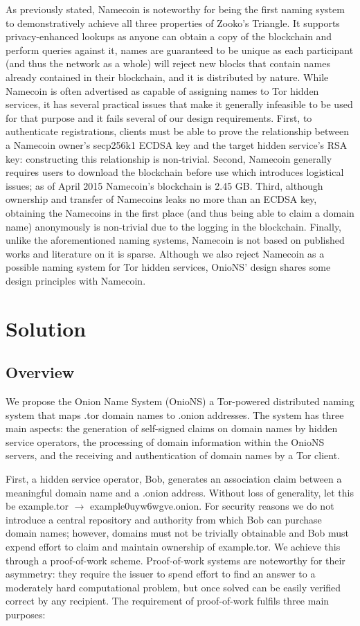 \documentclass{sig-alternate}
\begin{document}
As previously stated, Namecoin is noteworthy for being the first naming system to demonstratively achieve all three properties of Zooko's Triangle. It supports privacy-enhanced lookups as anyone can obtain a copy of the blockchain and perform queries against it, names are guaranteed to be unique as each participant (and thus the network as a whole) will reject new blocks that contain names already contained in their blockchain, and it is distributed by nature. While Namecoin is often advertised as capable of assigning names to Tor hidden services, it has several practical issues that make it generally infeasible to be used for that purpose and it fails several of our design requirements. First, to authenticate registrations, clients must be able to prove the relationship between a Namecoin owner's secp256k1 ECDSA key and the target hidden service's RSA key: constructing this relationship is non-trivial. Second, Namecoin generally requires users to download the blockchain before use which introduces logistical issues; as of April 2015 Namecoin's blockchain is 2.45 GB.\cite{BitInfoCharts} Third, although ownership and transfer of Namecoins leaks no more than an ECDSA key, obtaining the Namecoins in the first place (and thus being able to claim a domain name) anonymously is non-trivial due to the logging in the blockchain. Finally, unlike the aforementioned naming systems, Namecoin is not based on published works and literature on it is sparse. Although we also reject Namecoin as a possible naming system for Tor hidden services, OnioNS' design shares some design principles with Namecoin.

\section{Solution}

\subsection{Overview}

We propose the Onion Name System (OnioNS) a Tor-powered distributed naming system that maps .tor domain names to .onion addresses. The system has three main aspects: the generation of self-signed claims on domain names by hidden service operators, the processing of domain information within the OnioNS servers, and the receiving and authentication of domain names by a Tor client.

First, a hidden service operator, Bob, generates an association claim between a meaningful domain name and a .onion address. Without loss of generality, let this be example.tor $ \rightarrow $ example0uyw6wgve.onion. For security reasons we do not introduce a central repository and authority from which Bob can purchase domain names; however, domains must not be trivially obtainable and Bob must expend effort to claim and maintain ownership of example.tor. We achieve this through a proof-of-work scheme. Proof-of-work systems are noteworthy for their asymmetry: they require the issuer to spend effort to find an answer to a moderately hard computational problem, but once solved can be easily verified correct by any recipient. The requirement of proof-of-work fulfils three main purposes:
\end{document}
